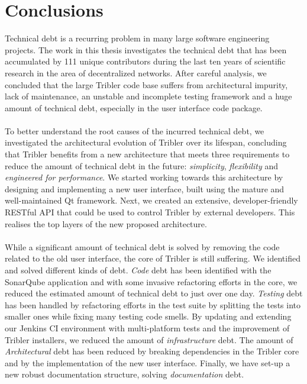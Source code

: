 \chapter{Conclusions}
\label{chapter:conclusions}

Technical debt is a recurring problem in many large software engineering projects. The work in this thesis investigates the technical debt that has been accumulated by 111 unique contributors during the last ten years of scientific research in the area of decentralized networks. After careful analysis, we concluded that the large Tribler code base suffers from architectural impurity, lack of maintenance, an unstable and incomplete testing framework and a huge amount of technical debt, especially in the user interface code package.\\\\
To better understand the root causes of the incurred technical debt, we investigated the architectural evolution of Tribler over its lifespan, concluding that Tribler benefits from a new architecture that meets three requirements to reduce the amount of technical debt in the future: \emph{simplicity}, \emph{flexibility} and \emph{engineered for performance}. We started working towards this architecture by designing and implementing a new user interface, built using the mature and well-maintained Qt framework. Next, we created an extensive, developer-friendly RESTful API that could be used to control Tribler by external developers. This realises the top layers of the new proposed architecture.\\\\
While a significant amount of technical debt is solved by removing the code related to the old user interface, the core of Tribler is still suffering. We identified and solved different kinds of debt. \emph{Code} debt has been identified with the SonarQube application and with some invasive refactoring efforts in the core, we reduced the estimated amount of technical debt to just over one day. \emph{Testing} debt has been handled by refactoring efforts in the test suite by splitting the tests into smaller ones while fixing many testing code smells. By updating and extending our Jenkins CI environment with multi-platform tests and the improvement of Tribler installers, we reduced the amount of \emph{infrastructure} debt. The amount of \emph{Architectural} debt has been reduced by breaking dependencies in the Tribler core and by the implementation of the new user interface. Finally, we have set-up a new robust documentation structure, solving \emph{documentation} debt.\\\\
